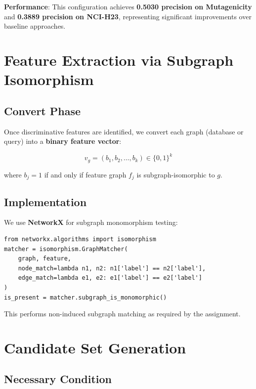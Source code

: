\documentclass[12pt,a4paper]{article}
\begin{document}
\textbf{Performance}: This configuration achieves \textbf{0.5030 precision on Mutagenicity} and \textbf{0.3889 precision on NCI-H23}, representing significant improvements over baseline approaches.

\section{Feature Extraction via Subgraph Isomorphism}

\subsection{Convert Phase}

Once discriminative features are identified, we convert each graph (database or query) into a \textbf{binary feature vector}:

\[
v_g = (b_1, b_2, \ldots, b_k) \in \{0,1\}^k
\]

where $b_j = 1$ if and only if feature graph $f_j$ is subgraph-isomorphic to $g$.

\subsection{Implementation}

We use \textbf{NetworkX} for subgraph monomorphism testing:

\begin{verbatim}
from networkx.algorithms import isomorphism
matcher = isomorphism.GraphMatcher(
    graph, feature,
    node_match=lambda n1, n2: n1['label'] == n2['label'],
    edge_match=lambda e1, e2: e1['label'] == e2['label']
)
is_present = matcher.subgraph_is_monomorphic()
\end{verbatim}

This performs non-induced subgraph matching as required by the assignment.

\section{Candidate Set Generation}

\subsection{Necessary Condition}
\end{document}
